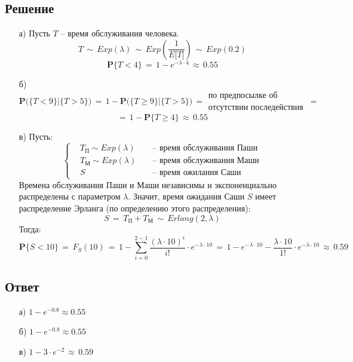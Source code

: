 \documentclass{article}
\begin{document}
\subsection*{Решение}
\begin{enumerate}
\item[а)] Пусть $ T $ -- время обслуживания человека.
\[ T \, \sim \, Exp(\lambda) \, \sim \, Exp \left( \dfrac{1}{E \big[ T \big]} \right) \, \sim \, Exp(0.2) \]
\[ \mathbf{P} \big\{ T \! < \! 4 \big\} \, = \, 1 \! - \! e^{-\lambda \cdot 4} \, \approx \, 0.55 \]
\item[б)]
\[ \mathbf{P} \bigg( \big\{ T \! < \! 9 \big\} \big| \big\{ T \! > \! 5 \big\} \bigg) \, = \, 1 \! - \! \mathbf{P} \bigg( \big\{ T \! \geqslant \! 9 \big\} \big| \big\{ T \! > \! 5 \big\} \bigg) \, = 
\begin{matrix}
\text{по предпосылке об} \\
\text{отсутствии последействия}
\end{matrix} \, = \]
\[ = \, 1 \! - \! \mathbf{P} \big\{ T \! \geqslant \! 4 \big\} \, \approx \, 0.55 \]
\item[в)] Пусть:
\begin{equation*}
\left\{
\begin{aligned}
& T_\text{П} \! \sim \! Exp(\lambda) \! & & \text{ -- время обслуживания Паши} \\
& T_\text{М} \! \sim \! Exp(\lambda) \! & & \text{ -- время обслуживания Маши} \\
& S & & \text{ -- время ожилания Саши}
\end{aligned}
\right.
\end{equation*}
Времена обслуживания Паши и Маши независимы и экспоненциально распределены с параметром $ \lambda $. Значит, время ожидания Саши $ S $ имеет распределение Эрланга (по определению этого распределения):
\[ S \, = \, T_\text{П} \! + \! T_\text{М} \, \sim \, Erlang(2,\lambda) \]
Тогда:
\[ \mathbf{P} \big\{ S \! < \! 10 \big\} \, = \, F_S(10) \, = \, 1 \! - \! \sum_{i=0}^{2-1} \dfrac{(\lambda \! \cdot \! 10)^i}{i!} \! \cdot \! e^{-\lambda \cdot 10} \, = \, 1 \! - \! e^{-\lambda \cdot 10} \! - \! \dfrac{\lambda \! \cdot \! 10}{1!} \! \cdot \! e^{-\lambda \cdot 10} \, \approx \, 0.59 \]
\end{enumerate}
\subsection*{Ответ}
\begin{enumerate}
\item[а)] $ 1 \! - \! e^{-0.8} \! \approx \! 0.55 $
\item[б)] $ 1 \! - \! e^{-0.8} \! \approx \! 0.55 $
\item[в)] $ 1 \! - \! 3 \! \cdot \! e^{-2} \, \approx \, 0.59 $
\end{enumerate}
\end{document}
